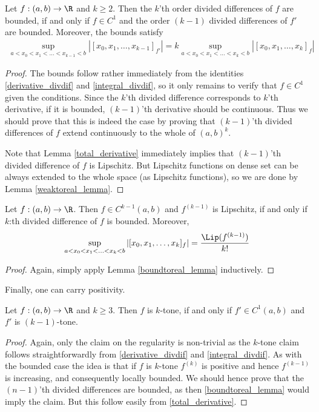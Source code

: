 \begin{lem}\label{boundtoreal_lemma}
	Let $f : (a, b) \to \R$ and $k \geq 2$. Then the $k$'th order divided differences of $f$ are bounded, if and only if $f \in C^{1}$ and the order $(k - 1)$ divided differences of $f'$ are bounded. Moreover, the bounds satisfy
	\begin{align*}
		\sup_{a < x_{0} < x_{1} < \ldots < x_{k - 1} < b} |[x_{0}, x_{1}, \ldots, x_{k - 1}]_{f'}| = k \sup_{a < x_{0} < x_{1} < \ldots < x_{k}< b} |[x_{0}, x_{1}, \ldots, x_{k}]_{f}|
	\end{align*}
\end{lem}
\begin{proof}
	The bounds follow rather immediately from the identities \ref{derivative_divdif} and \ref{integral_divdif}, so it only remains to verify that $f \in C^{1}$ given the conditions. Since the $k$'th divided difference corresponds to $k$'th derivative, if it is bounded, $(k - 1)$'th derivative should be continuous. Thus we should prove that this is indeed the case by proving that $(k - 1)$'th divided differences of $f$ extend continuously to the whole of $(a, b)^{k}$.

	Note that Lemma \ref{total_derivative} immediately implies that $(k - 1)$'th divided difference of $f$ is Lipschitz. But Lipschitz functions on dense set can be always extended to the whole space (as Lipschitz functions), so we are done by Lemma \ref{weaktoreal_lemma}.
\end{proof}

\begin{lause}\label{bounded_div}
	Let $f : (a, b) \to \R$. Then $f \in C^{k - 1}(a, b)$ and $f^{(k - 1)}$ is Lipschitz, if and only if $k$:th divided difference of $f$ is bounded. Moreover,
	\begin{align*}
		\sup_{a < x_{0} < x_{1} < \ldots < x_{k}< b} |[x_{0}, x_{1}, \ldots, x_{k}]_{f}| = \frac{\Lip(f^{(k - 1)})}{k!}
	\end{align*}
\end{lause}
\begin{proof}
	Again, simply apply Lemma \ref{boundtoreal_lemma} inductively.
\end{proof}

Finally, one can carry positivity.

\begin{lem}\label{postoreal_lemma}
	Let $f : (a, b) \to \R$ and $k \geq 3$. Then $f$ is $k$-tone, if and only if $f' \in C^{1}(a, b)$ and $f'$ is $(k - 1)$-tone.
\end{lem}
\begin{proof}
	Again, only the claim on the regularity is non-trivial as the $k$-tone claim follows straightforwardly from  \ref{derivative_divdif} and \ref{integral_divdif}. As with the bounded case the idea is that if $f$ is $k$-tone $f^{(k)}$ is positive and hence $f^{(k - 1)}$ is increasing, and consequently locally bounded. We should hence prove that the $(n - 1)$'th divided differences are bounded, as then \ref{boundtoreal_lemma} would imply the claim. But this follow easily from \ref{total_derivative}.
\end{proof}

